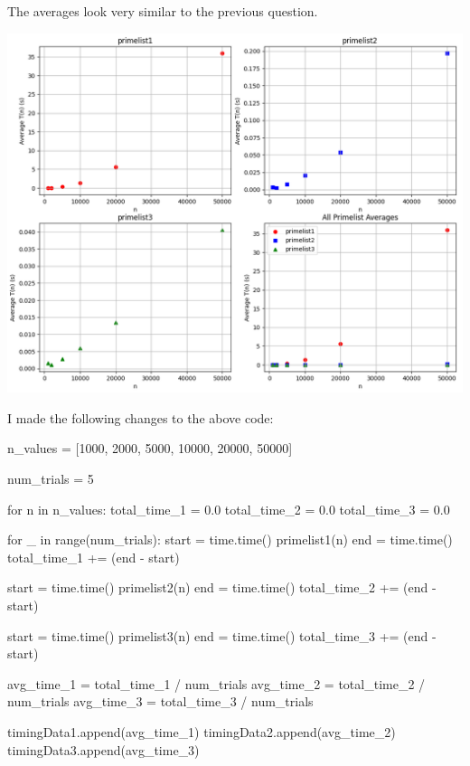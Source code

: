 \documentclass[11pt,twoside,openany]{memoir}
\begin{document}
        \begin{solution}
            The averages look very similar to the previous question.
            \begin{center}
                \includegraphics[scale=.6]{Figure_2}
            \end{center}

            I made the following changes to the above code:
            \begin{python}
n_values = [1000, 2000, 5000, 10000, 20000, 50000]

num_trials = 5

for n in n_values:
total_time_1 = 0.0
total_time_2 = 0.0
total_time_3 = 0.0

for _ in range(num_trials):
    start = time.time()
    primelist1(n)
    end = time.time()
    total_time_1 += (end - start)
    
    start = time.time()
    primelist2(n)
    end = time.time()
    total_time_2 += (end - start)
    
    start = time.time()
    primelist3(n)
    end = time.time()
    total_time_3 += (end - start)

avg_time_1 = total_time_1 / num_trials
avg_time_2 = total_time_2 / num_trials
avg_time_3 = total_time_3 / num_trials

timingData1.append(avg_time_1)
timingData2.append(avg_time_2)
timingData3.append(avg_time_3)
            \end{python}
        \end{solution}
\end{document}
